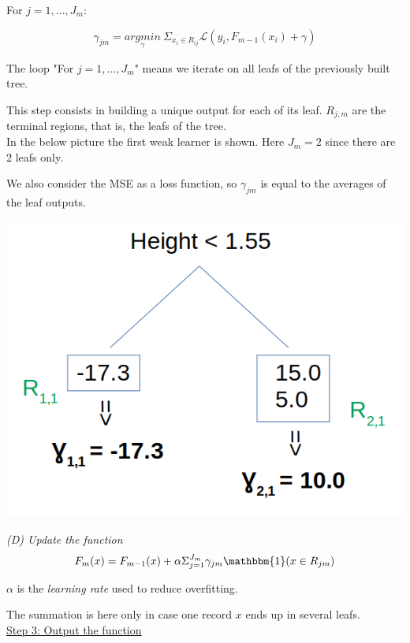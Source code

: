 For $j=1,...,J_m$:

$$\gamma_{jm} = \underset{\gamma}{argmin}~\Sigma_{x_i \in R_{ij}} \mathcal{L}(y_i, F_{m-1}(x_i)+\gamma)$$

The loop "For $j=1,...,J_m$" means we iterate on all leafs of the previously built tree.

This step consists in building a unique output for each of its leaf. $R_{j,m}$ are the terminal regions, that is, the leafs of the tree. \\

In the below picture the first weak learner is shown. Here $J_m=2$ since there are 2 leafs only.

We also consider the MSE as a loss function, so $\gamma_{jm}$ is equal to the averages of the leaf outputs.

\begin{center}
\includegraphics[scale=0.3]{GBM_regression_leafs.png}
\end{center}

\textit{(D) Update the function} \\

$$F_m(x) = F_ {m-1}(x) + \alpha \Sigma_{j=1}^{J_m} \gamma_{jm} \mathbbm{1}(x \in R_{jm})$$

$\alpha$ is the \textit{learning rate} used to reduce overfitting.

The summation is here only in case one record $x$ ends up in several leafs.\\

\underline{Step 3: Output the function} \\


